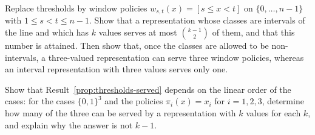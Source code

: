 \begin{exercise}
Replace thresholds by window policies $w_{s,t}(x)=[s\le x<t]$ on $\{0,\dots,n-1\}$ with $1\le s<t\le n-1$. Show that a representation whose classes are intervals of the line and which has $k$ values serves at most $\binom{k-1}{2}$ of them, and that this number is attained. Then show that, once the classes are allowed to be non-intervals, a three-valued representation can serve three window policies, whereas an interval representation with three values serves only one.\label{ex:windows}
\end{exercise}

\begin{exercise}
Show that Result~\ref{prop:thresholds-served} depends on the linear order of the cases: for the cases $\{0,1\}^{3}$ and the policies $\pi_i(x)=x_i$ for $i=1,2,3$, determine how many of the three can be served by a representation with $k$ values for each $k$, and explain why the answer is not $k-1$.
\end{exercise}

